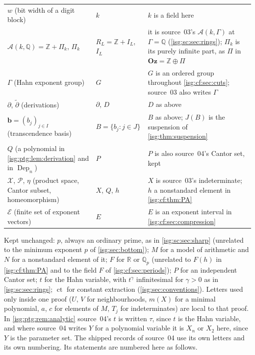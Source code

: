 \documentclass[11pt]{article}
\theoremstyle{definition}
\theoremstyle{remark}
\newcommand{\Oz}{\ensuremath{\mathbf{Oz}}}
\newcommand{\R}{\mathbb{R}}
\newcommand{\Z}{\mathbb{Z}}
\newcommand{\ct}{\operatorname{ct}}
\newcommand{\Q}{\mathbb{Q}}
\newcommand{\Asc}{\mathcal{A}}
\newcommand{\Qp}{\mathbb{Q}_p}
\newcommand{\Dep}{\operatorname{Dep}}
\begin{document}
\begin{longtable}{@{}>{\raggedright\arraybackslash}p{}>{\raggedright\arraybackslash}p{}>{\raggedright\arraybackslash}p{}@{}}
$w$ (bit width of a digit block) & $k$ & $k$ is a field here\\
$\Asc(k,\Q)=\Z+\Pi_k$, $\Pi_k$ & $R_L=\Z+I_L$, $I_L$ & it is source~03's
 $\Asc(k,\Gamma)$ at $\Gamma=\Q$ (\cref{isg:sc:sec:rings}); $\Pi_k$ is its
 purely infinite part, as $\Pi$ in $\Oz=\Z\oplus\Pi$\\
$\Gamma$ (Hahn exponent group) & $G$ & $G$ is an ordered group throughout
 \cref{isg:cf:sec:cuts}; source~03 also writes $\Gamma$\\
$\partial$, $\widetilde\partial$ (derivations) & $\partial$, $D$ & $D$ as
 above\\
$\mathbf b=(b_j)_{j\in I}$ (transcendence basis) & $B=\{b_j:j\in J\}$ &
 $B$ as above; $J(B)$ is the suspension of \cref{isg:thm:suspension}\\
$Q$ (a polynomial in \cref{isg:ptg:lem:derivation} and in $\Dep_n$) & $P$ &
 $P$ is also source~04's Cantor set, kept\\
$\mathcal X$, $\mathcal P$, $\eta$ (product space, Cantor subset,
 homeomorphism) & $X$, $Q$, $h$ & $X$ is source~03's indeterminate; $h$ a
 nonstandard element in \cref{isg:cf:thm:PA}\\
$\mathcal E$ (finite set of exponent vectors) & $E$ & $E$ is an exponent
 interval in \cref{isg:cf:sec:compression}\\
\bottomrule
\end{longtable}
\endgroup
Kept unchanged: $p$, always an ordinary prime, as in
\cref{isg:sc:sec:sharp} (unrelated to the minimum exponent $p$ of
\cref{isg:sec:bottom}); $M$ for a model of arithmetic and $N$ for a
nonstandard element of it; $F$ for $\R$ or $\Qp$ (unrelated to $F(h)$ in
\cref{isg:cf:thm:PA} and to the field $F$ of \cref{isg:cf:sec:periods});
$P$ for an independent Cantor set; $t$ for the Hahn variable, with
$t^\gamma$ infinitesimal for $\gamma>0$ as in \cref{isg:sc:sec:rings};
$\ct$ for constant extraction (\cref{isg:sec:conventions}). Letters used
only inside one proof ($U$, $V$ for neighbourhoods, $m(X)$ for a minimal
polynomial, $a$, $c$ for elements of $M$, $T_j$ for indeterminates) are
local to that proof. In \cref{isg:ptg:rem:analytic} source~04's $t$ is
written $\tau$, since $t$ is the Hahn variable, and where source~04 writes
$Y$ for a polynomial variable it is $X_n$ or $X_2$ here, since $Y$ is the
parameter set. The shipped records of source~04 use its own letters
and its own numbering. Its statements are numbered here as follows.
\end{document}
